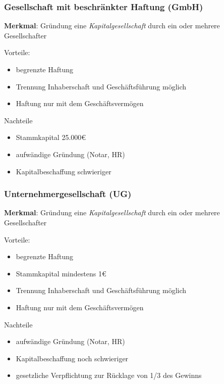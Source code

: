 \documentclass[]{article}
\begin{document}
\subsubsection{Gesellschaft mit beschränkter Haftung (GmbH)}
\textbf{Merkmal}: Gründung eine \textit{Kapitalgesellschaft} durch ein oder mehrere Gesellschafter

\begin{minipage}[t]{0.45\textwidth}
	Vorteile:
	\begin{itemize}
		\item begrenzte Haftung
		\item Trennung Inhaberschaft und Geschäftsführung möglich
		\item Haftung nur mit dem Geschäftsvermögen 
	\end{itemize}
\end{minipage}
\hfill
\begin{minipage}[t]{0.45\textwidth}
	Nachteile
	\begin{itemize}
		\item Stammkapital 25.000€
		\item aufwändige Gründung (Notar, HR)
		\item Kapitalbeschaffung schwieriger
	\end{itemize}
\end{minipage}

\subsubsection{Unternehmergesellschaft (UG)}
\textbf{Merkmal}: Gründung eine \textit{Kapitalgesellschaft} durch ein oder mehrere Gesellschafter

\begin{minipage}[t]{0.45\textwidth}
	Vorteile:
	\begin{itemize}
		\item begrenzte Haftung
		\item Stammkapital mindestens 1€
		\item Trennung Inhaberschaft und Geschäftsführung möglich
		\item Haftung nur mit dem Geschäftsvermögen 
	\end{itemize}
\end{minipage}
\hfill
\begin{minipage}[t]{0.45\textwidth}
	Nachteile
	\begin{itemize}
		\item aufwändige Gründung (Notar, HR)
		\item Kapitalbeschaffung noch schwieriger
		\item gesetzliche Verpflichtung zur Rücklage von 1/3 des Gewinns
	\end{itemize}
\end{minipage}
\end{document}
